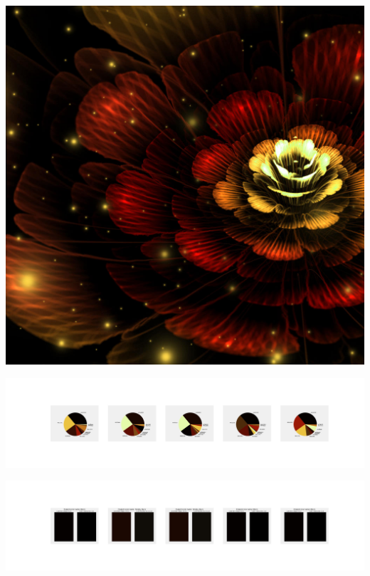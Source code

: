 \documentclass[11pt]{article}
\begin{document}
\begin{landscape}
    \begin{center}
    \includegraphics[width=\textwidth]{./nbimg/file (101).jpg}
    \end{center}

    \begin{center}
    \includegraphics[width=250mm]{./nbimg/pie-3.jpg}
    \end{center}

    \begin{center}
    \includegraphics[width=250mm]{./nbimg/peak-3.jpg}
    \end{center}
    


\end{landscape}
\end{document}
